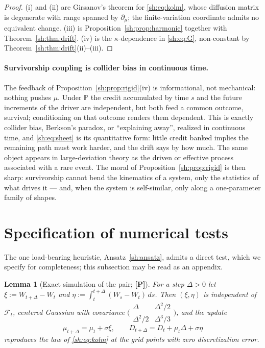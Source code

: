 \documentclass[11pt]{article}
\numberwithin{equation}{section}
\theoremstyle{plain}
\newtheorem{lemma}[theorem]{Lemma}
\theoremstyle{definition}
\theoremstyle{remark}
\newcommand{\PP}{\mathbb{P}}
\newcommand{\Fc}{\mathcal{F}}
\begin{document}
\begin{proof}
(i) and (ii) are Girsanov's theorem for \eqref{sh:eq:kolm}, whose
diffusion matrix is degenerate with range spanned by $\partial_\mu$; the
finite-variation coordinate admits no equivalent change. (iii) is
Proposition~\ref{sh:prop:harmonic} together with
Theorem~\ref{sh:thm:drift}. (iv) is the $\kappa$-dependence in
\eqref{sh:eq:G}, non-constant by Theorem~\ref{sh:thm:drift}(ii)--(iii).
\end{proof}

\paragraph{Survivorship coupling is collider bias in continuous time.}\label{sh:rem:collider}
The feedback of Proposition~\ref{sh:prop:rigid}(iv) is informational, not
mechanical: nothing pushes $\mu$. Under $\PP$ the credit accumulated by
time $s$ and the future increments of the driver are independent, but
both feed a common outcome, survival; conditioning on that outcome
renders them dependent. This is exactly collider bias, Berkson's
paradox, or ``explaining away'', realized in continuous time, and
\eqref{sh:eq:sheet} is its quantitative form: little credit banked
implies the remaining path must work harder, and the drift says by how
much. The same object appears in large-deviation theory as the driven or
effective process associated with a rare event. The moral of
Proposition~\ref{sh:prop:rigid} is then sharp: survivorship cannot bend
the kinematics of a system, only the statistics of what drives it ---
and, when the system is self-similar, only along a one-parameter family
of shapes.

\section{Specification of numerical tests}\label{app:numerics}

\label{sh:sub:numerics}

The one load-bearing heuristic, Ansatz~\ref{sh:ansatz}, admits a direct
test, which we specify for completeness; this subsection may be read as an
appendix.

\begin{lemma}[Exact simulation of the pair; \textbf{[P]}]\label{sh:lem:exact}
For a step $\Delta>0$ let $\xi:=W_{t+\Delta}-W_t$ and
$\eta:=\int_t^{t+\Delta}(W_s-W_t)\,ds$. Then $(\xi,\eta)$ is independent of
$\Fc_t$, centered Gaussian with covariance
$\bigl(\begin{smallmatrix}\Delta&\Delta^2/2\\
\Delta^2/2&\Delta^3/3\end{smallmatrix}\bigr)$, and the update
\[
\mu_{t+\Delta}=\mu_t+\sigma\xi,\qquad
D_{t+\Delta}=D_t+\mu_t\Delta+\sigma\eta
\]
reproduces the law of \eqref{sh:eq:kolm} at the grid points with zero
discretization error.
\end{lemma}
\end{document}
